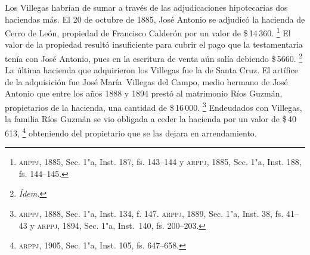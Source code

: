 \documentclass[14pt,twoside,final]{extbook} %
\let\oldfootnote\footnote
\renewcommand\footnote[1]{%
\oldfootnote{\hspace{1mm}#1}}
\begin{document}
Los Villegas habrían de sumar a través de las adjudicaciones hipotecarias dos haciendas más. El 20 de octubre de 1885, José Antonio se adjudicó la hacienda de Cerro de León, propiedad de Francisco Calderón por un valor de \$\,14\,360.\footnote{\textsc{arppj}, 1885, Sec. 1"a, Inst. 187, fs. 143--144 y \textsc{arppj}, 1885, Sec. 1"a, Inst. 188, fs. 144--145.} El valor de la propiedad resultó insuficiente para cubrir el pago que la testamentaria tenía con José Antonio, pues en la escritura de venta aún salía debiendo \$\,5660.\footnote{\em Ídem.} La última hacienda que adquirieron los Villegas fue la de Santa Cruz. El artífice de la adquisición fue José María~Villegas del Campo, medio hermano de José Antonio que entre los años 1888 y 1894 prestó al matrimonio Ríos Guzmán, propietarios de la hacienda, una cantidad de \$\,16\,000.\footnote{\textsc{arppj}, 1888, Sec. 1"a, Inst. 134, f. 147. \textsc{arppj}, 1889, Sec. 1"a, Inst. 38, fs. 41--43 y \textsc{arppj}, 1894, Sec. 1"a, Inst.~140, fs. 200--203.} Endeudados con Villegas, la familia Ríos Guzmán se vio obligada a ceder la hacienda por un valor de \$\,40\,613,\footnote{\textsc{arppj}, 1905, Sec. 1"a, Inst. 105, fs. 647--658.} obteniendo del propietario que se las dejara en arrendamiento.
\end{document}
